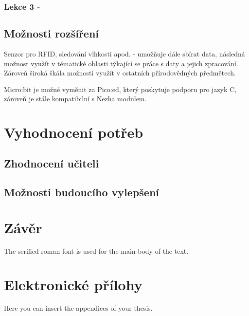 \documentclass[
  digital,     %
  oneside,     %
  nosansbold,  %
  colorbold, %
  lof,         %
  nolot,         %
]{fithesis4}
\begin{document}
\subsection{Lekce 3 - }

\section{Možnosti rozšíření}
Senzor pro RFID, sledování vlhkosti apod. - umožňuje dále sbírat data, následná možnost využít v tématické oblasti týkající se práce s daty a jejich zpracování. Zároveň široká škála možností využít v ostatních přírodovědných předmětech.

Micro:bit je možné vyměnit za Pico:ed, který poskytuje podporu pro jazyk C, zároveň je stále kompatibilní s Nezha modulem. 

\chapter{Vyhodnocení potřeb}

\section{Zhodnocení učiteli}

\section{Možnosti budoucího vylepšení}


\chapter{Závěr}
The serified roman font is used for the main body of the text.


\printbibliography[heading=bibintoc] %

  \makeatletter\thesis@blocks@clear\makeatother
  \printindex

\appendix %
\chapter{Elektronické přílohy}
Here you can insert the appendices of your thesis.
\end{document}
